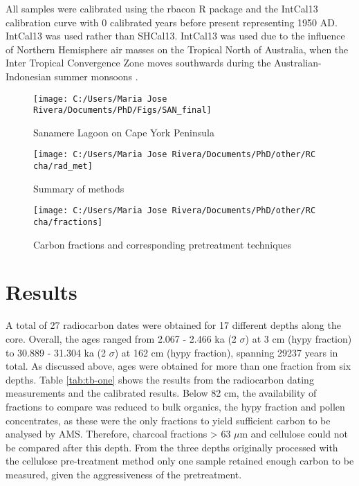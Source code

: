 \documentclass[
  12pt,
]{book}
\begin{document}
All samples were calibrated using the rbacon R package \citep{blaauwRbaconAgedepthModelling2019} and the IntCal13 calibration curve \citep{reimerIntCal13Marine13Radiocarbon2013} with 0 calibrated years before present representing 1950 AD. IntCal13 was used rather than SHCal13. IntCal13 was used due to the influence of Northern Hemisphere air masses on the Tropical North of Australia, when the Inter Tropical Convergence Zone moves southwards during the Australian-Indonesian summer monsoons \citep{hoggSHCal13SouthernHemisphere2013}.

\begin{figure}

{\centering \texttt{[image: C:/Users/Maria Jose Rivera/Documents/PhD/Figs/SAN\_final]} 

}

\caption{Sanamere Lagoon on Cape York Peninsula}\label{fig:radiocarbon1}
\end{figure}



\begin{figure}

{\centering \texttt{[image: C:/Users/Maria Jose Rivera/Documents/PhD/other/RC cha/rad\_met]} 

}

\caption{Summary of methods}\label{fig:radiocarbonmet}
\end{figure}



\begin{figure}

{\centering \texttt{[image: C:/Users/Maria Jose Rivera/Documents/PhD/other/RC cha/fractions]} 

}

\caption{Carbon fractions and corresponding pretreatment techniques}\label{fig:fractions}
\end{figure}



\hypertarget{results-1}{%
\section{Results}\label{results-1}}



A total of 27 radiocarbon dates were obtained for 17 different depths along the core. Overall, the ages ranged from 2.067 - 2.466 ka (2 \(\sigma\)) at 3 cm (hypy fraction) to 30.889 - 31.304 ka (2 \(\sigma\)) at 162 cm (hypy fraction), spanning 29237 years in total. As discussed above, ages were obtained for more than one fraction from six depths. Table \ref{tab:tb-one} shows the results from the radiocarbon dating measurements and the calibrated results. Below 82 cm, the availability of fractions to compare was reduced to bulk organics, the hypy fraction and pollen concentrates, as these were the only fractions to yield sufficient carbon to be analysed by AMS. Therefore, charcoal fractions \textgreater{} 63 \(\mu\)m and cellulose could not be compared after this depth. From the three depths originally processed with the cellulose pre-treatment method only one sample retained enough carbon to be measured, given the aggressiveness of the pretreatment.
\end{document}
